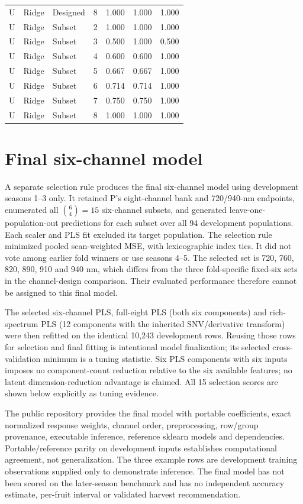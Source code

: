 \documentclass[10pt,a4paper]{article}
\begin{document}
\begin{longtable}{lllrrrr}
U & Ridge & Designed & 8 & 1.000 & 1.000 & 1.000 \\
U & Ridge & Subset & 2 & 1.000 & 1.000 & 1.000 \\
U & Ridge & Subset & 3 & 0.500 & 1.000 & 0.500 \\
U & Ridge & Subset & 4 & 0.600 & 0.600 & 1.000 \\
U & Ridge & Subset & 5 & 0.667 & 0.667 & 1.000 \\
U & Ridge & Subset & 6 & 0.714 & 0.714 & 1.000 \\
U & Ridge & Subset & 7 & 0.750 & 0.750 & 1.000 \\
U & Ridge & Subset & 8 & 1.000 & 1.000 & 1.000 \\
\end{longtable}
\endgroup

\section{Final six-channel model}
A separate selection rule produces the final six-channel model using development seasons 1--3 only. It retained P's eight-channel bank and 720/940-nm endpoints, enumerated all $\binom{6}{4}=15$ six-channel subsets, and generated leave-one-population-out predictions for each subset over all 94 development populations. Each scaler and PLS fit excluded its target population. The selection rule minimized pooled scan-weighted MSE, with lexicographic index ties. It did not vote among earlier fold winners or use seasons 4--5. The selected set is 720, 760, 820, 890, 910 and 940 nm, which differs from the three fold-specific fixed-six sets in the channel-design comparison. Their evaluated performance therefore cannot be assigned to this final model.

The selected six-channel PLS, full-eight PLS (both six components) and rich-spectrum PLS (12 components with the inherited SNV/derivative transform) were then refitted on the identical 10,243 development rows. Reusing those rows for selection and final fitting is intentional model finalization; its selected cross-validation minimum is a tuning statistic. Six PLS components with six inputs imposes no component-count reduction relative to the six available features; no latent dimension-reduction advantage is claimed. All 15 selection scores are shown below explicitly as tuning evidence.

The public repository provides the final model with portable coefficients, exact normalized response weights, channel order, preprocessing, row/group provenance, executable inference, reference sklearn models and dependencies. Portable/reference parity on development inputs establishes computational agreement, not generalization. The three example rows are development training observations supplied only to demonstrate inference. The final model has not been scored on the later-season benchmark and has no independent accuracy estimate, per-fruit interval or validated harvest recommendation.
\end{document}
